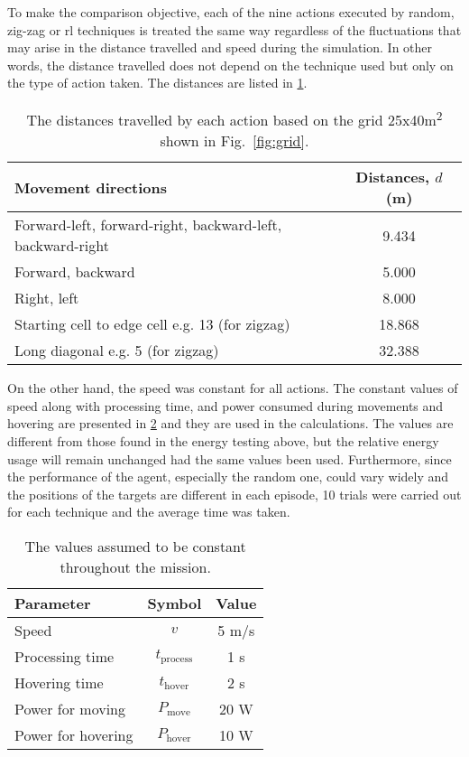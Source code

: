 \documentclass[../main.tex]{subfiles}
\begin{document}
To make the comparison objective, 
each of the nine actions executed by random, zig-zag
or \gls{rl} techniques is treated the same way regardless 
of the fluctuations that may arise in the 
distance travelled and speed during
the simulation.
In other words, the distance travelled does not depend
on the technique used but only 
on the type of action taken. 
The distances are listed in \cref{tab:distances}.

\begin{table}[tbp]
\caption{The distances travelled by each action based on
    the grid 25x40m\textsuperscript{2} shown in 
    Fig.~\ref{fig:grid}.}
\label{tab:distances}
\centering
\begin{tabular}{p{3.4in} c}
\toprule
Movement directions & Distances, $d$ (m) \\
\midrule
\raggedright Forward-left, forward-right, 
backward-left, backward-right & 9.434 \\
Forward, backward & 5.000 \\
Right, left & 8.000 \\
Starting cell to edge cell e.g. 13\textrightarrow 1 (for zigzag) & 18.868 \\
\raggedright Long diagonal e.g. 5\textrightarrow 6 (for zigzag) & 32.388 \\
\bottomrule
\end{tabular}
\end{table}

On the other hand, the speed was constant for all actions. 
The constant values of speed along with processing time,
and power consumed during movements and hovering
are presented
in \cref{tab:assumptions}
and they are used in the calculations.
The values are different from those found in the energy testing above,
but the relative energy usage will remain unchanged had the same
values been used.
Furthermore, since the performance of the agent,
especially the random one, could vary widely and
the positions of the targets are different in each episode, 
10 trials were carried out for each technique and
the average time was taken.

\begin{table}[tbp]
\caption{The values assumed to be constant throughout the
mission.}
\label{tab:assumptions}
\centering
\begin{tabular}{l c c}
\toprule
Parameter & Symbol & Value \\
\midrule
Speed & $v$ & 5 m/s \\
Processing time & $t_{\text{process}}$ & 1 s \\
Hovering time & $t_{\text{hover}}$ & 2 s \\
Power for moving & $P_{\text{move}}$ & 20 W \\
Power for hovering & $P_{\text{hover}}$ & 10 W \\
\bottomrule
\end{tabular}
\end{table}
\end{document}
